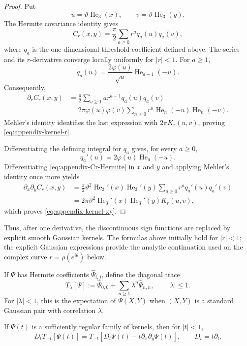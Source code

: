 \begin{proof}
Put
\[
  u=\vartheta\operatorname{He}_3(x),
  \qquad
  v=\vartheta\operatorname{He}_3(y).
\]
The Hermite covariance identity gives
\begin{equation}
  C_r(x,y)=\frac{\pi}{2}\sum_{a\ge0}r^a q_a(u)q_a(v),
  \label{eq:appendix-Cr-Hermite}
\end{equation}
where $q_a$ is the one-dimensional threshold coefficient defined above.  The
series and its $r$-derivative converge locally uniformly for $|r|<1$.  For
$a\ge1$,
\[
  q_a(u)=\frac{2\varphi(u)}{\sqrt a}\operatorname{He}_{a-1}(-u).
\]
Consequently,
\begin{align*}
  \partial_rC_r(x,y)
  &=\frac{\pi}{2}\sum_{a\ge1}a r^{a-1}q_a(u)q_a(v)\\
  &=2\pi\varphi(u)\varphi(v)
    \sum_{n\ge0}r^n\operatorname{He}_n(-u)
                         \operatorname{He}_n(-v).
\end{align*}
Mehler's identity identifies the last expression with $2\pi K_r(u,v)$,
proving \eqref{eq:appendix-kernel-r}.

Differentiating the defining integral for $q_a$ gives, for every $a\ge0$,
\[
  q_a'(u)=2\varphi(u)\operatorname{He}_a(-u).
\]
Differentiating \eqref{eq:appendix-Cr-Hermite} in $x$ and $y$ and applying
Mehler's identity once more yields
\begin{align*}
  \partial_x\partial_yC_r(x,y)
  &=\frac{\pi}{2}\vartheta^2\operatorname{He}_3'(x)
    \operatorname{He}_3'(y)
    \sum_{a\ge0}r^a q_a'(u)q_a'(v)\\
  &=2\pi\vartheta^2\operatorname{He}_3'(x)
    \operatorname{He}_3'(y)K_r(u,v),
\end{align*}
which proves \eqref{eq:appendix-kernel-xy}.
\end{proof}

Thus, after one derivative, the discontinuous sign functions are replaced by
explicit smooth Gaussian kernels.  The formulas above initially hold for
$|r|<1$; the explicit Gaussian expressions provide the analytic continuation
used on the complex curve $r=\rho(e^{i\theta})$ below.

If $\Psi$ has Hermite coefficients $\widehat\Psi_{i,j}$, define the diagonal
trace
\[
  T_\lambda[\Psi]
  :=\widehat\Psi_{0,0}+\sum_{n\ge1}\lambda^n\widehat\Psi_{n,n},
  \qquad |\lambda|\le1.
\]
For $|\lambda|<1$, this is the expectation of $\Psi(X,Y)$ when $(X,Y)$ is a
standard Gaussian pair with correlation $\lambda$.

\begin{lemma}
\label{lem:appendix-trace-differentiation}
If $\Psi(t)$ is a sufficiently regular family of kernels, then for $|t|<1$,
\begin{equation}
  D_tT_{-t}[\Psi(t)]
  =T_{-t}\!\left[D_t\Psi(t)-t\partial_x\partial_y\Psi(t)\right],
  \qquad D_t=t\partial_t.
  \label{eq:appendix-trace-differentiation}
\end{equation}
\end{lemma}

